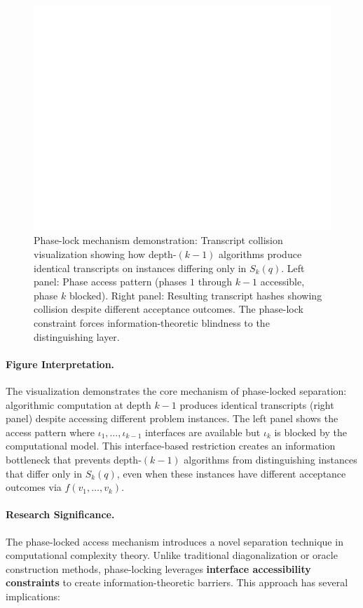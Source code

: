 \begin{figure}[t]
  \centering
  \includegraphics[width=0.62\linewidth]{fig/lkphase_transcript.png}
  \caption{Phase-lock mechanism demonstration: Transcript collision visualization showing how depth-$(k{-}1)$ algorithms produce identical transcripts on instances differing only in $S_k(q)$. Left panel: Phase access pattern (phases $1$ through $k{-}1$ accessible, phase $k$ blocked). Right panel: Resulting transcript hashes showing collision despite different acceptance outcomes. The phase-lock constraint forces information-theoretic blindness to the distinguishing layer.}
  \label{Lkphase:fig:transcript}
\end{figure}

\paragraph{Figure Interpretation.}
The visualization demonstrates the core mechanism of phase-locked separation: algorithmic computation at depth $k{-}1$ produces identical transcripts (right panel) despite accessing different problem instances. The left panel shows the access pattern where $\iota_1,\ldots,\iota_{k-1}$ interfaces are available but $\iota_k$ is blocked by the computational model. This interface-based restriction creates an information bottleneck that prevents depth-$(k{-}1)$ algorithms from distinguishing instances that differ only in $S_k(q)$, even when these instances have different acceptance outcomes via $f(v_1,\ldots,v_k)$.

\paragraph{Research Significance.}
The phase-locked access mechanism introduces a novel separation technique in computational complexity theory. Unlike traditional diagonalization or oracle construction methods, phase-locking leverages \textbf{interface accessibility constraints} to create information-theoretic barriers. This approach has several implications:

